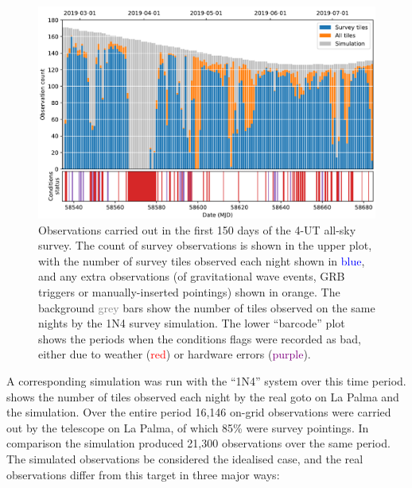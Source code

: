 \begin{colsection}
\begin{colsection}
\begin{figure}[t]
    \begin{center}
        \includegraphics[width=\linewidth]{images/150.pdf}
    \end{center}

    \caption[Observations carried out in the first 150 days of the 4-UT all-sky survey]{
        Observations carried out in the first 150 days of the 4-UT all-sky survey. The count of survey observations is shown in the upper plot, with the number of survey tiles observed each night shown in \textcolor{Blue}{blue}, and any extra observations (of gravitational wave events, GRB triggers or manually-inserted pointings) shown in \textcolor{BurntOrange}{orange}. The background \textcolor{Gray}{grey} bars show the number of tiles observed on the same nights by the 1N4 survey simulation. The lower ``barcode'' plot shows the periods when the conditions flags were recorded as bad, either due to weather (\textcolor{Red}{red}) or hardware errors (\textcolor{Purple}{purple}).
    }\label{fig:150}
\end{figure}

A corresponding simulation was run with the ``1N4'' system over this time period.  shows the number of tiles observed each night by the real \gls{goto} on La Palma and the simulation. Over the entire period 16,146 on-grid observations were carried out by the telescope on La Palma, of which 85\% were survey pointings. In comparison the simulation produced 21,300 observations over the same period. The simulated observations be considered the idealised case, and the real observations differ from this target in three major ways:


\end{colsection}
\end{colsection}
